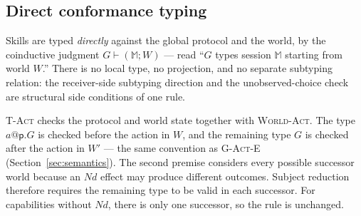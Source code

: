 \documentclass{article}
\theoremstyle{plain}
\theoremstyle{definition}
\newcommand{\Nd}{\mathit{Nd}}
\newcommand{\MM}{\mathbb{M}}
\newcommand{\ppar}{\;\|\;}
\newcommand{\prt}[1]{\mathsf{prt}(#1)}
\newcommand{\set}[1]{\{#1\}}
\newcommand{\End}{\mathsf{End}}
\def \bgc {}
\def \egc {}
\begin{document}
\subsection{Direct conformance typing}
\label{sec:process-typing}
Skills are typed \emph{directly} against the global protocol and the world, by
the coinductive judgment $G\vdash(\MM;W)$ --- read ``$G$ types session $\MM$
starting from world $W$.'' There is no local type, no projection, and no
separate subtyping relation: the receiver-side subtyping direction and the
unobserved-choice check are structural side conditions of one rule.
\textsc{T-Act} checks the protocol and world state together with
\textsc{World-Act}. The type $a@\mathsf p.G$ is checked before the action in
$W$, and the remaining type $G$ is checked after the action in $W'$ --- the
same convention as \textsc{G-Act-E} (Section~\ref{sec:semantics}). \bgc The
second premise considers every possible successor world because an $\Nd$
effect may produce different outcomes. Subject reduction therefore requires
the remaining type to be valid in each successor. For capabilities without
$\Nd$, there is only one successor, so the rule is unchanged.\egc
\end{document}
